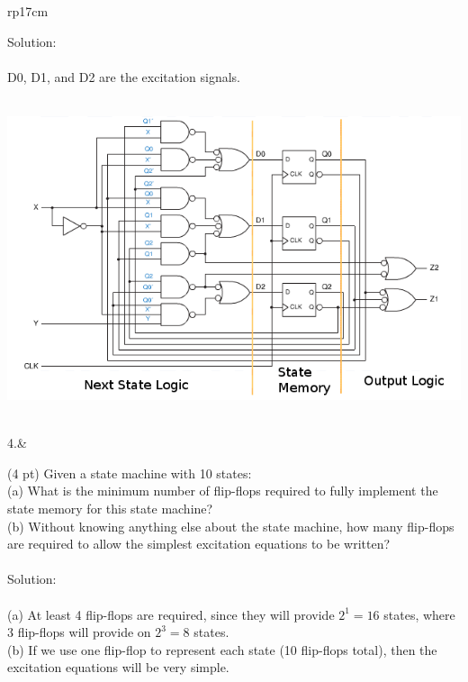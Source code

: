 \documentclass{article}
\begin{document}
\begin{longtable}[l]{rp{17cm}}
\begin{minipage}[t]{\linewidth}
Solution: \\ \\
D0, D1, and D2 are the excitation signals.\\ \\
\begin{center}
  \includegraphics[scale=0.7]{../StateMachines/Assessments/Wakerly_7_43_annotated}
\end{center}
\end{minipage}\\
\medskip
4.&\begin{minipage}[t]{\linewidth}(4 pt) Given a state machine with 10 states:\\
(a) What is the minimum number of flip-flops required to fully implement the state memory for this state machine?\\
(b) Without knowing anything else about the state machine, how many flip-flops are required to allow the simplest excitation equations to be written?\\ \\

Solution: \\ \\
(a) At least 4 flip-flops are required, since they will provide $2^1=16$ states, where 3 flip-flops will provide on $2^3=8$ states.\\
(b) If we use one flip-flop to represent each state (10 flip-flops total), then the excitation equations will be very simple.\\
\end{minipage}\\
\medskip
\end{longtable}
\end{document}
